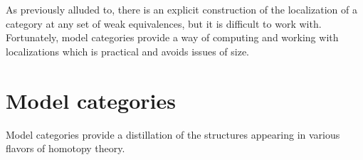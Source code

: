 \documentclass[main.tex]{subfiles}
\begin{document}

As previously alluded to, there is an explicit construction of the localization of a category at any set of weak equivalences, but it is difficult to work with. Fortunately, model categories provide a way of computing and working with localizations which is practical and avoids issues of size.

\section{Model categories}
\label{sec:model_categories}

Model categories provide a distillation of the structures appearing in various flavors of homotopy theory.
\end{document}

